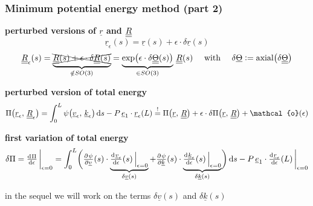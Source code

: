 \begin{frame}
  \frametitle{Minimum potential energy method (part 2)}
  
  \textbf{perturbed versions of $\underline{r}$ and $\underline{\underline{R}}$}
  \begin{displaymath}
    \underline{r}_{\epsilon}(s) = \underline{r}(s) + \epsilon \cdot \delta \underline{r}(s)
  \end{displaymath}
  \vspace{-0.5em}
  \begin{displaymath}
    \underline{\underline{R}}_{\epsilon}(s) = \underbrace{\xcancel{\underline{\underline{R}}(s) + \epsilon \cdot \delta \underline{\underline{R}}(s)}}_{\notin SO(3)} = \underbrace{\exp \bigl( \epsilon \cdot \delta \underline{\underline{\Theta}}(s) \bigr)}_{\in SO(3)} \, \underline{\underline{R}}(s)
    \quad \text{ with } \quad
    \delta \underline{\Theta} := \mathrm{axial} \bigl( \delta \underline{\underline{\Theta}} \bigr)
  \end{displaymath}
  
  \vspace{0.6em}
  \textbf{perturbed version of total energy}
  \begin{displaymath}
    \Pi \bigl( \underline{r}_{\epsilon}, \, \doubleunderline{R}_{\epsilon} \bigr) =
    \int_0^L \psi \bigl( \underline{v}_{\epsilon} , \, \underline{k}_{\epsilon} \bigr) \dif s - P \, \underline{e}_1 \cdot \underline{r}_{\epsilon}(L) \overset{!}{=}
    \Pi \bigl( \underline{r}, \, \doubleunderline{R} \bigr) + \epsilon \cdot \delta \Pi \bigl( \underline{r}, \, \doubleunderline{R} \bigr) + \mathcal{o}(\epsilon)
  \end{displaymath}
  
  \vspace{0.6em}
  \textbf{first variation of total energy}
  \begin{displaymath}
    \delta \Pi = \od{\Pi}{\epsilon} \sVert[3]_{\epsilon=0} =
    \int_0^L \biggl(
    \pd{\psi}{\underline{v}}(s) \cdot \underbrace{ \od{\underline{v}_{\epsilon}}{\epsilon}(s) \sVert[2]_{\epsilon=0} }_{\delta \underline{v}(s)} +
    \pd{\psi}{\underline{k}}(s) \cdot \underbrace{ \od{\underline{k}_{\epsilon}}{\epsilon}(s)\sVert[2]_{\epsilon=0} }_{\delta \underline{k}(s)}
    \biggr) \dif s
    - P \, \underline{e}_1 \cdot \od{\underline{r}_{\epsilon}}{\epsilon}(L) \sVert[3]_{\epsilon=0}
  \end{displaymath}
  
  in the sequel we will work on the terms $\delta \underline{v}(s)$ and $\delta \underline{k}(s)$
\end{frame}


